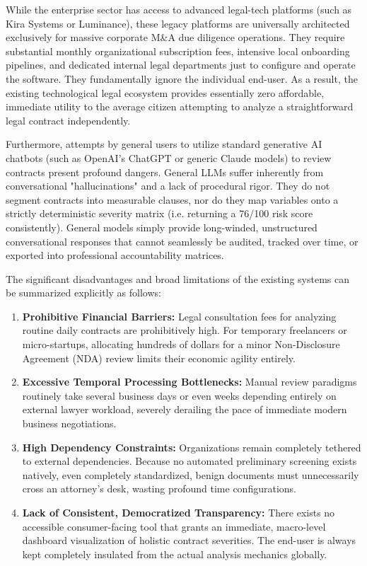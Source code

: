 \documentclass[a4paper,12pt]{report}
\begin{document}
While the enterprise sector has access to advanced legal-tech platforms (such as Kira Systems or Luminance), these legacy platforms are universally architected exclusively for massive corporate M\&A due diligence operations. They require substantial monthly organizational subscription fees, intensive local onboarding pipelines, and dedicated internal legal departments just to configure and operate the software. They fundamentally ignore the individual end-user. As a result, the existing technological legal ecosystem provides essentially zero affordable, immediate utility to the average citizen attempting to analyze a straightforward legal contract independently.

Furthermore, attempts by general users to utilize standard generative AI chatbots (such as OpenAI's ChatGPT or generic Claude models) to review contracts present profound dangers. General LLMs suffer inherently from conversational "hallucinations" and a lack of procedural rigor. They do not segment contracts into measurable clauses, nor do they map variables onto a strictly deterministic severity matrix (i.e. returning a 76/100 risk score consistently). General models simply provide long-winded, unstructured conversational responses that cannot seamlessly be audited, tracked over time, or exported into professional accountability matrices. 

The significant disadvantages and broad limitations of the existing systems can be summarized explicitly as follows:

\begin{enumerate}
    \item \textbf{Prohibitive Financial Barriers:} Legal consultation fees for analyzing routine daily contracts are prohibitively high. For temporary freelancers or micro-startups, allocating hundreds of dollars for a minor Non-Disclosure Agreement (NDA) review limits their economic agility entirely.
    \item \textbf{Excessive Temporal Processing Bottlenecks:} Manual review paradigms routinely take several business days or even weeks depending entirely on external lawyer workload, severely derailing the pace of immediate modern business negotiations.
    \item \textbf{High Dependency Constraints:} Organizations remain completely tethered to external dependencies. Because no automated preliminary screening exists natively, even completely standardized, benign documents must unnecessarily cross an attorney's desk, wasting profound time configurations.
    \item \textbf{Lack of Consistent, Democratized Transparency:} There exists no accessible consumer-facing tool that grants an immediate, macro-level dashboard visualization of holistic contract severities. The end-user is always kept completely insulated from the actual analysis mechanics globally.
\end{enumerate}
\end{document}
